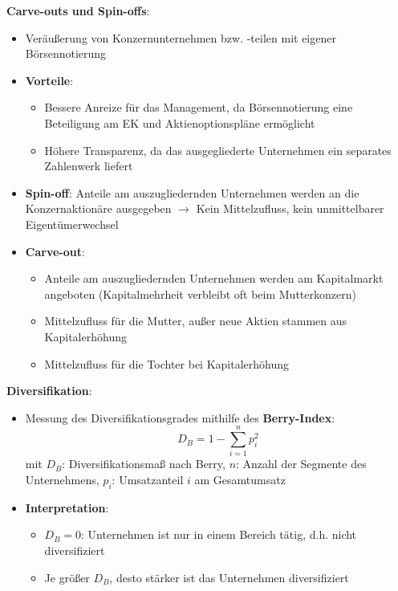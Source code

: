 \textbf{Carve-outs und Spin-offs}:
\begin{itemize}
	\item Veräußerung von Konzernunternehmen bzw. -teilen mit eigener Börsennotierung
	\item \textbf{Vorteile}: 
	\begin{itemize}
		\item Bessere Anreize für das Management, da Börsennotierung eine Beteiligung am EK und Aktienoptionspläne ermöglicht
		\item Höhere Transparenz, da das ausgegliederte Unternehmen ein separates Zahlenwerk liefert
	\end{itemize}
	\item \textbf{Spin-off}: Anteile am auszugliedernden Unternehmen werden an die Konzernaktionäre ausgegeben $\rightarrow$ Kein Mittelzufluss, kein unmittelbarer Eigentümerwechsel
	\item \textbf{Carve-out}: 
	\begin{itemize}
		\item Anteile am auszugliedernden Unternehmen werden  am Kapitalmarkt angeboten (Kapitalmehrheit verbleibt oft beim Mutterkonzern)
		\item Mittelzufluss für die Mutter, außer neue Aktien stammen aus Kapitalerhöhung
		\item Mittelzufluss für die Tochter bei Kapitalerhöhung
	\end{itemize}
\end{itemize}
\bigskip
\textbf{Diversifikation}:
\begin{itemize}
	\item Messung des Diversifikationsgrades mithilfe des \textbf{Berry-Index}:
	$$D_B=1-\sum\limits_{i=1}^n p_i^2$$
	mit $D_B$: Diversifikationsmaß nach Berry, $n$: Anzahl der Segmente des Unternehmens, $p_i$: Umsatzanteil $i$ am Gesamtumsatz
	\item \textbf{Interpretation}: 
	\begin{itemize}
		\item $D_B = 0$: Unternehmen ist nur in einem Bereich tätig, d.h. nicht diversifiziert
		\item Je größer $D_B$, desto stärker ist das Unternehmen diversifiziert
	\end{itemize}
\end{itemize}

